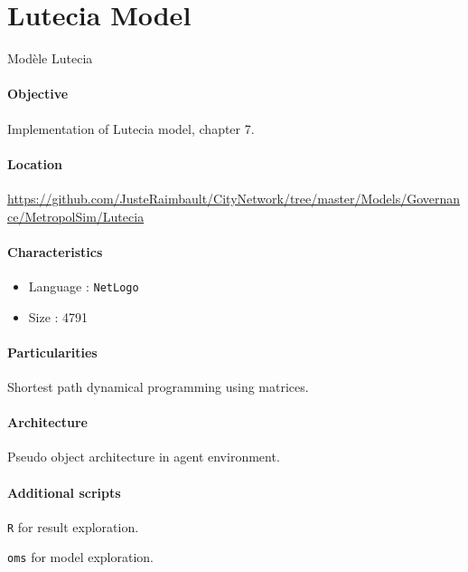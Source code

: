 

\section{Lutecia Model}{Modèle Lutecia}

\paragraph{Objective}

Implementation of Lutecia model, chapter 7.

\paragraph{Location}

\url{https://github.com/JusteRaimbault/CityNetwork/tree/master/Models/Governance/MetropolSim/Lutecia}

\paragraph{Characteristics}

\begin{itemize}
\item Language : \texttt{NetLogo}
\item Size : 4791
\end{itemize}


\paragraph{Particularities}

Shortest path dynamical programming using matrices.

\paragraph{Architecture}

Pseudo object architecture in agent environment.

\paragraph{Additional scripts}

\texttt{R} for result exploration.

\texttt{oms} for model exploration.




